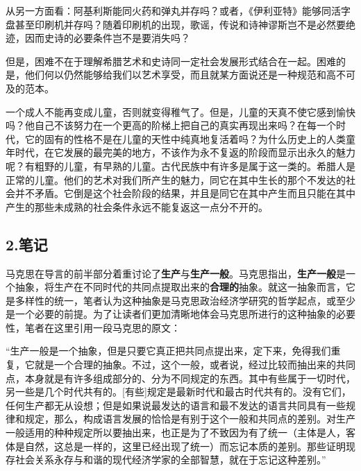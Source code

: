 \documentclass[a4paper,twoside,12pt]{ctexart}
\begin{document}
从另一方面看：阿基利斯能同火药和弹丸并存吗？或者，《伊利亚特》能够同活字盘甚至印刷机并存吗？随着印刷机的出现，歌谣，传说和诗神谬斯岂不是必然要绝迹，因而史诗的必要条件岂不是要消失吗？

但是，困难不在于理解希腊艺术和史诗同一定社会发展形式结合在一起。困难的是，他们何以仍然能够给我们以艺术享受，而且就某方面说还是一种规范和高不可及的范本。

一个成人不能再变成儿童，否则就变得稚气了。但是，儿童的天真不使它感到愉快吗？他自己不该努力在一个更高的阶梯上把自己的真实再现出来吗？在每一个时代，它的固有的性格不是在儿童的天性中纯真地复活着吗？为什么历史上的人类童年时代，在它发展的最完美的地方，不该作为永不复返的阶段而显示出永久的魅力呢？有粗野的儿童，有早熟的儿童。古代民族中有许多是属于这一类的。希腊人是正常的儿童。他们的艺术对我们所产生的魅力，同它在其中生长的那个不发达的社会并不矛盾。它倒是这个社会阶段的结果，并且是同它在其中产生而且只能在其中产生的那些未成熟的社会条件永远不能复返这一点分不开的。
\newpage
\subsection{2.笔记}
马克思在导言的前半部分着重讨论了\textbf{生产}与\textbf{生产一般}。马克思指出，\textbf{生产一般}是一个抽象，将生产在不同时代的共同点提取出来的\textbf{合理的}抽象。就这一抽象而言，它是多样性的统一，笔者认为这种抽象是马克思政治经济学研究的哲学起点，或至少是一个必要的前提。为了让读者们更加清晰地体会马克思所进行的这种抽象的必要性，笔者在这里引用一段马克思的原文：

\begin{fangsong}
    “生产一般是一个抽象，但是只要它真正把共同点提出来，定下来，免得我们重复，它就是一个合理的抽象。不过，这个一般，或者说，经过比较而抽出来的共同点，本身就是有许多组成部分的、分为不同规定的东西。其中有些属于一切时代，另一些是几个时代共有的。[有些]规定是最新时代和最古时代共有的。没有它们，任何生产都无从设想；但是如果说最发达的语言和最不发达的语言共同具有一些规律和规定，那么，构成语言发展的恰恰是有别于这个一般和共同点的差别。对生产一般适用的种种规定所以要抽出来，也正是为了不致因为有了统一（主体是人，客体是自然，这总是一样的，这里已经出现了统一）而忘记本质的差别。那些证明现存社会关系永存与和谐的现代经济学家的全部智慧，就在于忘记这种差别。”
\end{fangsong}
\end{document}
